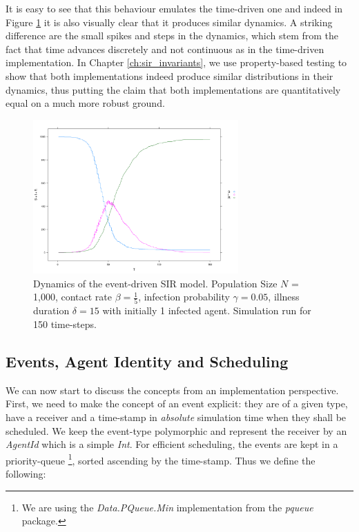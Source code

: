 \medskip

It is easy to see that this behaviour emulates the time-driven one and indeed in Figure \ref{fig:sir_eventdriven_dynamics} it is also visually clear that it produces similar dynamics. A striking difference are the small spikes and steps in the dynamics, which stem from the fact that time advances discretely and not continuous as in the time-driven implementation. In Chapter \ref{ch:sir_invariants}, we use property-based testing to show that both implementations indeed produce similar distributions in their dynamics, thus putting the claim that both implementations are quantitatively equal on a much more robust ground.

\begin{figure}
	\centering
	\includegraphics[width=0.7\textwidth, angle=0]{./fig/eventdriven/sir_eventdriven.png}
	\caption{Dynamics of the event-driven SIR model. Population Size $N$ = 1,000, contact rate $\beta = \frac{1}{5}$, infection probability $\gamma = 0.05$, illness duration $\delta = 15$ with initially 1 infected agent. Simulation run for 150 time-steps.}
	\label{fig:sir_eventdriven_dynamics}
\end{figure}

\subsection{Events, Agent Identity and Scheduling}
We can now start to discuss the concepts from an implementation perspective. First, we need to make the concept of an event explicit: they are of a given type, have a receiver and a time-stamp in \textit{absolute} simulation time when they shall be scheduled. We keep the event-type polymorphic and represent the receiver by an \textit{AgentId} which is a simple \textit{Int}. For efficient scheduling, the events are kept in a priority-queue \footnote{We are using the \textit{Data.PQueue.Min} implementation from the \textit{pqueue} package.}, sorted ascending by the time-stamp. Thus we define the following:

